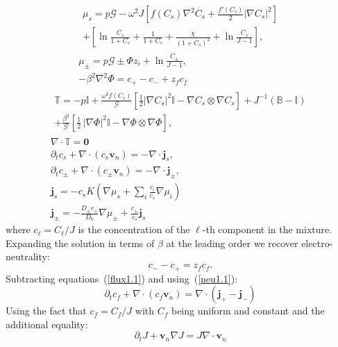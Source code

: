 \documentclass[12pt]{extarticle}
\begin{document}
\begin{gather}
\begin{aligned}
\mu_s = p \mathcal{G} - \omega^2 J \left[f(C_s)\nabla^2 C_s+\frac{f'(C_s)}{2}\left|\nabla C_s\right|^2\right]\\
 + \left[\ln \frac{C_s}{1+C_s} + \frac{1}{1+C_s}
 +\frac{\chi}{(1+C_s)^2} + \ln \frac{C_s}{J-1} \right], 
\end{aligned}\\[2.5mm]
\mu_\pm = p \mathcal{G} \pm \Phi z_i + \ln \frac{C_\pm}{J-1} ,\\
-\beta^2 \nabla^2 \Phi = c_+-c_-+z_fc_f\, 
\end{gather}
\begin{gather}
\begin{aligned}
\mathbb{T}= -p \mathbb{I} +\frac{\omega^2f(C_s) }{\mathcal{G}} \left[\frac{1}{2} |\nabla C_s|^2\mathbb{I} - \nabla C_s \otimes \nabla C_s\right]+ J^{-1}\left(\mathbb{B}-\mathbb{I}\right)\\
+ \frac{\beta^2}{\mathcal{G}} \left[\frac{1}{2} \,|\nabla \Phi|^2\mathbb{I} -\nabla \Phi \otimes \nabla \Phi\right],
\end{aligned}\\
\nabla \cdot \mathbb{T}=\mathbf{0}\\
\partial_t c_s + \nabla \cdot(c_s \mathbf{v}_n)=- \nabla \cdot\mathbf{j}_s,\\
\partial_t c_\pm + \nabla \cdot(c_\pm \mathbf{v}_n)= -\nabla\cdot\mathbf{j}_\pm,\label{flux1.1}\\
\mathbf{j}_s =-c_sK  \left(\nabla \mu_s +\sum_i \frac{c_i}{c_s} \nabla \mu_i\right)\\
\mathbf{j}_\pm= - \frac{D_\pm c_\pm}{D_0}\nabla \mu_\pm + \frac{c_\pm}{c_s}\mathbf{j}_s
\end{gather}
where $c_\ell=C_\ell/J$ is the concentration of the $\ell$-th component in the mixture.
Expanding the solution in terms of $\beta$ at the leading order we recover electro-neutrality:
\begin{equation}
c_- - c_+=z_f c_f. \label{neu1.1}
\end{equation}
Subtracting equations~(\ref{flux1.1}) and using~(\ref{neu1.1}):
\begin{equation}
\partial_t c_f +\nabla \cdot(c_f \mathbf{v}_n)= \nabla\cdot(\mathbf{j}_+-\mathbf{j}_-)
\end{equation}
Using the fact that $c_f=C_f/J$ with $C_f$ being uniform and constant and the additional equality:
\begin{equation}
\partial_t J + \mathbf{v}_n \nabla J=J\nabla \cdot\mathbf{v}_n
\end{equation}
\end{document}
